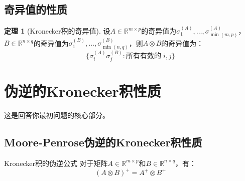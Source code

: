 \documentclass[11pt,a4paper]{ctexart}
\theoremstyle{definition}
\newtheorem{theorem}{定理}[section]
\newcommand{\RR}{\mathbb{R}}
\begin{document}
\subsection{奇异值的性质}

\begin{theorem}[Kronecker积的奇异值]
设$A \in \RR^{m \times p}$的奇异值为$\sigma_1^{(A)}, \ldots, \sigma_{\min(m,p)}^{(A)}$，$B \in \RR^{n \times q}$的奇异值为$\sigma_1^{(B)}, \ldots, \sigma_{\min(n,q)}^{(B)}$，则$A \otimes B$的奇异值为：
$$\{\sigma_i^{(A)} \sigma_j^{(B)} : \text{所有有效的} \; i, j\}$$
\end{theorem}

\section{伪逆的Kronecker积性质}

这是回答你最初问题的核心部分。

\subsection{Moore-Penrose伪逆的Kronecker积性质}

\begin{keylemma}{Kronecker积的伪逆公式}
对于矩阵$A \in \RR^{m \times p}$和$B \in \RR^{n \times q}$，有：
$$(A \otimes B)^+ = A^+ \otimes B^+$$
\end{keylemma}
\end{document}

